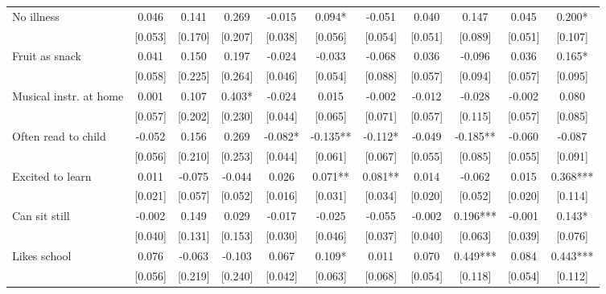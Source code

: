 \documentclass[12pt]{article}
\begin{document}
\begin{table}[ht]
\begin{center}
\begin{adjustbox}{width=1.2\textwidth,center=\textwidth}
\begin{tabular}{l*{10}{c}}
No illness & 0.046 & 0.141 & 0.269 & -0.015 & 0.094* & -0.051 & 0.040 & 0.147 & 0.045 & 0.200* \\
 & [0.053] & [0.170] & [0.207] & [0.038] & [0.056] & [0.054] & [0.051] & [0.089] & [0.051] & [0.107] \\
Fruit as snack & 0.041 & 0.150 & 0.197 & -0.024 & -0.033 & -0.068 & 0.036 & -0.096 & 0.036 & 0.165* \\
 & [0.058] & [0.225] & [0.264] & [0.046] & [0.054] & [0.088] & [0.057] & [0.094] & [0.057] & [0.095] \\
Musical instr. at home & 0.001 & 0.107 & 0.403* & -0.024 & 0.015 & -0.002 & -0.012 & -0.028 & -0.002 & 0.080 \\
 & [0.057] & [0.202] & [0.230] & [0.044] & [0.065] & [0.071] & [0.057] & [0.115] & [0.057] & [0.085] \\
Often read to child & -0.052 & 0.156 & 0.269 & -0.082* & -0.135** & -0.112* & -0.049 & -0.185** & -0.060 & -0.087 \\
 & [0.056] & [0.210] & [0.253] & [0.044] & [0.061] & [0.067] & [0.055] & [0.085] & [0.055] & [0.091] \\
Excited to learn & 0.011 & -0.075 & -0.044 & 0.026 & 0.071** & 0.081** & 0.014 & -0.062 & 0.015 & 0.368*** \\
 & [0.021] & [0.057] & [0.052] & [0.016] & [0.031] & [0.034] & [0.020] & [0.052] & [0.020] & [0.114] \\
Can sit still & -0.002 & 0.149 & 0.029 & -0.017 & -0.025 & -0.055 & -0.002 & 0.196*** & -0.001 & 0.143* \\
 & [0.040] & [0.131] & [0.153] & [0.030] & [0.046] & [0.037] & [0.040] & [0.063] & [0.039] & [0.076] \\
Likes school & 0.076 & -0.063 & -0.103 & 0.067 & 0.109* & 0.011 & 0.070 & 0.449*** & 0.084 & 0.443*** \\
 & [0.056] & [0.219] & [0.240] & [0.042] & [0.063] & [0.068] & [0.054] & [0.118] & [0.054] & [0.112] \\


\end{tabular}
\end{adjustbox}
\end{center}
\end{table}
\end{document}
